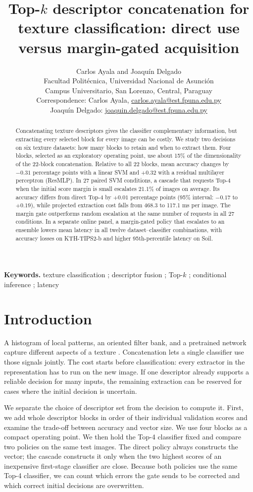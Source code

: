 \documentclass[10pt,a4paper,fleqn]{article}
\title{\fontsize{14}{17}\selectfont Top-\texorpdfstring{$k$}{k} descriptor concatenation for texture classification: direct use versus margin-gated acquisition}
\author{\fontsize{8}{10}\selectfont Carlos Ayala and Joaquín Delgado\\
\fontsize{8}{10}\selectfont Facultad Politécnica, Universidad Nacional de Asunción\\
\fontsize{8}{10}\selectfont Campus Universitario, San Lorenzo, Central, Paraguay\\
\fontsize{8}{10}\selectfont Correspondence: Carlos Ayala, \href{mailto:carlos.ayala@est.fpuna.edu.py}{carlos.ayala@est.fpuna.edu.py}\\
\fontsize{8}{10}\selectfont Joaquín Delgado: \href{mailto:joaquin.delgado@est.fpuna.edu.py}{joaquin.delgado@est.fpuna.edu.py}}
\date{}
\begin{document}
\maketitle
\doublespacing

\begin{abstract}
Concatenating texture descriptors gives the classifier complementary information, but extracting every selected block for every image can be costly. We study two decisions on six texture datasets: how many blocks to retain and when to extract them. Four blocks, selected as an exploratory operating point, use about 15\% of the dimensionality of the 22-block concatenation. Relative to all 22 blocks, mean accuracy changes by $-0.31$ percentage points with a linear SVM and $+0.32$ with a residual multilayer perceptron (ResMLP). In 27 paired SVM conditions, a cascade that requests Top-4 when the initial score margin is small escalates 21.1\% of images on average. Its accuracy differs from direct Top-4 by $+0.01$ percentage points (95\% interval: $-0.17$ to $+0.19$), while projected extraction cost falls from 468.3 to 117.1 ms per image. The margin gate outperforms random escalation at the same number of requests in all 27 conditions. In a separate online panel, a margin-gated policy that escalates to an ensemble lowers mean latency in all twelve dataset--classifier combinations, with accuracy losses on KTH-TIPS2-b and higher 95th-percentile latency on Soil.
\end{abstract}

\noindent\textbf{Keywords.} texture classification ; descriptor fusion ; Top-$k$ ; conditional inference ; latency\par\medskip


\section{Introduction}

A histogram of local patterns, an oriented filter bank, and a pretrained network capture different aspects of a texture \citep{ojala2002lbp,haralick1979glcm,cimpoi2014dtd,cimpoi2016fisher}. Concatenation lets a single classifier use those signals jointly. The cost starts before classification: every extractor in the representation has to run on the new image. If one descriptor already supports a reliable decision for many inputs, the remaining extraction can be reserved for cases where the initial decision is uncertain.

We separate the choice of descriptor set from the decision to compute it. First, we add whole descriptor blocks in order of their individual validation scores and examine the trade-off between accuracy and vector size. We use four blocks as a compact operating point. We then hold the Top-4 classifier fixed and compare two policies on the same test images. The direct policy always constructs the vector; the cascade constructs it only when the two highest scores of an inexpensive first-stage classifier are close. Because both policies use the same Top-4 classifier, we can count which errors the gate sends to be corrected and which correct initial decisions are overwritten.
\end{document}
